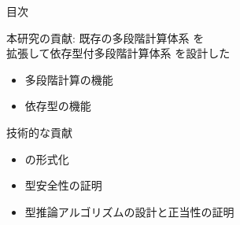 \documentclass[dvipdfmx,aspectratio=169, 20pt]{beamer}
\begin{document}
\begin{frame}{目次}
\end{frame}

\begin{frame}[fragile]{本研究の貢献: \LMD}
    既存の多段階計算体系  を\\
    拡張して依存型付多段階計算体系 \LMD を設計した
    \begin{itemize}
        \item 多段階計算の機能
        \item 依存型の機能
    \end{itemize}
    技術的な貢献
    \begin{itemize}
        \item \LMD の形式化
        \item 型安全性の証明
        \item 型推論アルゴリズムの設計と正当性の証明
    \end{itemize}
\end{frame}




\end{document}
